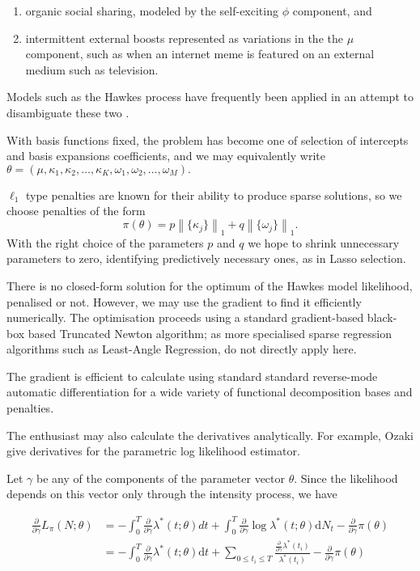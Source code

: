 \documentclass[11pt]{article}
\providecommand{\tightlist}{%
      \setlength{\itemsep}{0pt}\setlength{\parskip}{0pt}}
\newcommand{\dd}{\mathrm{d}}
\begin{document}
\begin{enumerate}
\def\labelenumi{\arabic{enumi}.}
\tightlist
\item
  organic social sharing, modeled by the self-exciting \(\phi\)
  component, and
\item
  intermittent external boosts represented as variations in the the
  \(\mu\) component, such as when an internet meme is featured on an
  external medium such as television.
\end{enumerate}

Models such as the Hawkes process have frequently been applied in an
attempt to disambiguate these two
\cite{crane_robust_2008,mitchell_hawkes_2010,rizoiu_expecting_2017}.

    With basis functions fixed, the problem has become one of selection of
intercepts and basis expansions coefficients, and we may equivalently
write
\(\theta=(\mu, \kappa_1,\kappa_2,\dots,\kappa_K,\omega_1, \omega_2,\dots,\omega_M).\)

\(\ell_1\) type penalties are known for their ability to produce sparse
solutions, so we choose penalties of the form
\[\pi(\theta)=p\left\|\{\kappa_j\}\right\|_1+q\left\|\{\omega_j\}\right\|_1.\]
With the right choice of the parameters \(p\) and \(q\) we hope to
shrink unnecessary parameters to zero, identifying predictively
necessary ones, as in Lasso selection.

    There is no closed-form solution for the optimum of the Hawkes model
likelihood, penalised or not. However, we may use the gradient to find
it efficiently numerically. The optimisation proceeds using a standard
gradient-based black-box based Truncated Newton algorithm; as more
specialised sparse regression algorithms such as Least-Angle Regression,
do not directly apply here.

The gradient is efficient to calculate using standard standard
reverse-mode automatic differentiation \cite{baydin_automatic_2014} for
a wide variety of functional decomposition bases and penalties.

The enthusiast may also calculate the derivatives analytically. For
example, Ozaki \cite{ozaki_maximum_1979} give derivatives for the
parametric log likelihood estimator.

    Let \(\gamma\) be any of the components of the parameter vector
\(\theta\). Since the likelihood depends on this vector only through the
intensity process, we have

\[\begin{aligned}
{ \scriptstyle \frac{\partial}{\partial\gamma} } L_\pi(N;\theta)&=-\int_0^T{ \scriptstyle \frac{\partial}{\partial\gamma} }\lambda^*(t;\theta)dt + \int_0^T { \scriptstyle \frac{\partial}{\partial\gamma} }\log \lambda^*(t;\theta) \dd N_t -{ \scriptstyle \frac{\partial}{\partial\gamma} }\pi(\theta) \\
&=-\int_0^T{ \scriptstyle \frac{\partial}{\partial\gamma} }\lambda^*(t;\theta)\dd t + \sum_{0\leq t_i\leq T} \frac{{ \scriptstyle \frac{\partial}{\partial\gamma} }\lambda^*(t_i)}{\lambda^*(t_i)} -{ \scriptstyle \frac{\partial}{\partial\gamma} }\pi(\theta)
\end{aligned}
\]
\end{document}

